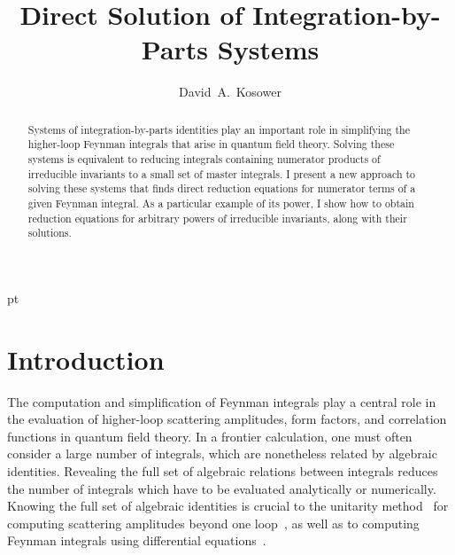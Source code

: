 \documentclass[aps,prd,preprint,groupedaddress,nofootinbib,showpacs,eqsecnum]{revtex4}
\begin{document}
 pt

\title{Direct Solution of Integration-by-Parts Systems}

\author{David~A.~Kosower}



\begin{abstract}
	Systems of integration-by-parts identities play an important role
	in simplifying the higher-loop Feynman integrals that arise in quantum
	field theory.  Solving these systems is equivalent to reducing
	integrals containing numerator products of irreducible invariants to
	a small set of master integrals.
	I present a new approach to solving these systems that
	finds direct reduction equations for numerator terms
	of a given Feynman integral.  As a particular example of its power,
	I show how to obtain reduction equations for arbitrary powers of 
	irreducible invariants, along with their solutions.
\end{abstract}

\pacs{\hspace{1cm}}

\maketitle

\section{Introduction}
\label{Introduction}

The computation and simplification of Feynman integrals play a central role
in the evaluation of higher-loop scattering amplitudes, form factors, 
and correlation functions in quantum field theory.  In a frontier calculation,
one must often consider a large number of integrals, which are nonetheless
related by algebraic identities.  Revealing the full set of algebraic
relations between integrals reduces the number of integrals which have
to be evaluated analytically or numerically.  Knowing the full set of
algebraic identities is crucial to the unitarity
method~\cite{UnitarityMethod,NumericalOnShell}
for computing
scattering amplitudes beyond one
loop~\cite{HigherLoopUnitarityMethodI,HigherLoopUnitarityMethodII,%
DunbarEtAl,FreiburgNumerical,BadgerTwoLoop},
as well as to computing Feynman integrals using 
differential equations~\cite{IntegralsViaDifferentialEquations}.
\end{document}
